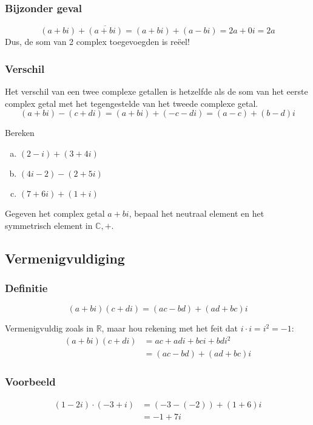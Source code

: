\documentclass[12pt,twoside,a4paper]{article}
\begin{document}
\subsubsection*{Bijzonder geval}
\[(a+bi) + \overline{(a+bi)}=(a+bi) + (a-bi) = 2a+0i = 2a\]
Dus, de som van 2 complex toegevoegden is reëel!

\subsubsection*{Verschil}
Het verschil van een twee complexe getallen is hetzelfde als de som van het eerste complex getal met het tegengestelde van het tweede complexe getal.
\[(a+bi)-(c+di)=(a+bi)+(-c-di)=(a-c)+(b-d)i\]

\begin{oefening}
  Bereken
  \begin{enumerate}[(a)]
  \itemsep1em
  \item $\displaystyle (2-i)+(3+4i)$
  \item $\displaystyle (4i-2)-(2+5i)$
  \item $\displaystyle (7+6i)+(1+i)$
  \end{enumerate}
\end{oefening}

\begin{oefening}
  Gegeven het complex getal $a+bi$, bepaal het neutraal element en het symmetrisch element in $\mathbb{C}, +$.
\end{oefening}

\subsection{Vermenigvuldiging}

\subsubsection*{Definitie}
\begin{mdframed}
\[(a+bi)(c+di) = (ac - bd) + (ad + bc)i\]
\end{mdframed}

Vermenigvuldig zoals in $\mathbb{R}$, maar hou rekening met het feit dat $i\cdot i=i^2=-1$:
\begin{align*}
  (a+bi)(c+di) &= ac + adi + bci + bdi^2\\
               &= (ac - bd) + (ad + bc)i
\end{align*}

\subsubsection*{Voorbeeld}
\begin{align*}
  (1-2i)\cdot(-3+i) &= (-3 - (-2)) + (1 + 6)i\\
               &= -1 + 7i
\end{align*}
\end{document}

